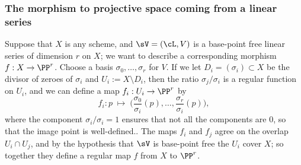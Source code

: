 %



\subsubsection{The morphism to projective space coming from a linear series} \label{morphism from series}

Suppose  that $X$ is any scheme, and $\sV = (\cL, V)$ is a base-point free linear series of dimension $r$ on $X$; we want to describe a corresponding morphism $f : X \to \PP^r$. Choose a basis $\sigma_0, \dots, \sigma_r$ for $V$. If we let $D_i = (\sigma_i) \subset X$ be the divisor of zeroes of $\sigma_i$ and $U_i := X \setminus D_i$, then the ratio $\sigma_j/\sigma_i$ is a regular function on $U_i$, and
we can define a map $f_i : U_i \to \PP^r$ by
$$
f_i : p \; \mapsto \; \big(\frac{\sigma_0}{\sigma_i}(p), \dots, \frac{\sigma_r}{\sigma_i}(p)\big), 
$$
where the component $\sigma_i/\sigma_i = 1$ ensures that not all the components are 0, so that the image point is well-defined..
The maps $f_i$ and $f_j$ agree on the overlap $U_i \cap U_j$, and by the hypothesis that $\sV$ is base-point free the $U_i$ cover $X$;
so together they define a regular map $f$ from $X$ to $\PP^r$. 

